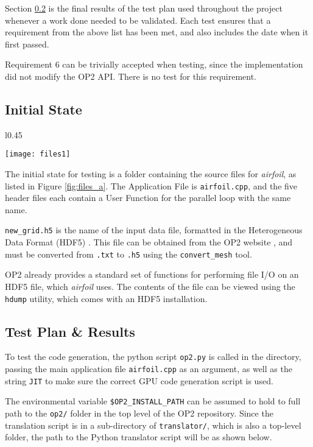 \noindent Section \ref{ss:results} is the final results of the test plan used throughout the project whenever a work done needed to be validated. Each test  ensures that a requirement from the above list has been met, and also includes the date when it first passed.
\par
Requirement 6 can be trivially accepted when testing, since the implementation did not modify the OP2 API. There is no test for this requirement.

\subsection{Initial State}
\begin{wrapfigure}[18]{l}{0.45\textwidth}
  \centering
\caption{\textit{airfoil} folder initial state}
\label{fig:files_a}
\texttt{[image: files1]}
\end{wrapfigure}
The initial state for testing is a folder containing the source files for \textit{airfoil}, as listed in Figure \ref{fig:files_a}. The Application File is \verb|airfoil.cpp|, and the five header files each contain a User Function for the parallel loop with the same name.
\par
\verb|new_grid.h5| is the name of the input data file, formatted in the Heterogeneous Data Format (HDF5) \cite{HDF5}. This file can be obtained from the OP2 website \cite{op-dsl}, and must be converted from \verb|.txt| to \verb|.h5| using the \verb|convert_mesh| tool.
\par
OP2 already provides a standard set of functions for performing file I/O on an HDF5 file, which \textit{airfoil} uses. The contents of the file can be viewed using the \verb|hdump| utility, which comes with an HDF5 installation.

\clearpage
\subsection{Test Plan \& Results}
\label{ss:results}

\hspace{\parindent}
To test the code generation, the python script \verb|op2.py| is called in the directory, passing the main application file \verb|airfoil.cpp| as an argument, as well as the string \verb|JIT| to make sure the correct GPU code generation script is used. \par
The environmental variable \verb|$OP2_INSTALL_PATH| can be assumed to hold to full path to the \verb|op2/| folder in the top level of the OP2 repository. Since the translation script is in a sub-directory of \verb|translator/|, which is also a top-level folder, the path to the Python translator script will be as shown below.

